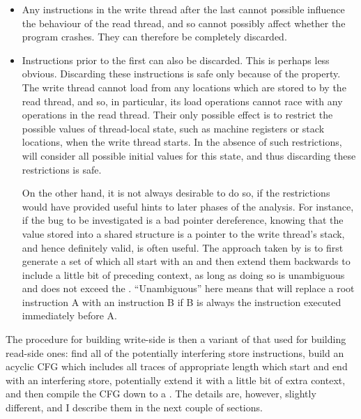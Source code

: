 \begin{itemize}
\item Any instructions in the write thread after the last
   cannot possible influence the behaviour
  of the read thread, and so cannot possibly affect whether the
  program crashes.  They can therefore be completely discarded.
\item Instructions prior to the first  can
  also be discarded.  This is perhaps less obvious.  Discarding these
  instructions is safe only because of the 
  property.  The write thread cannot load from any locations which are
  stored to by the read thread, and so, in particular, its load
  operations cannot race with any operations in the read thread.
  Their only possible effect is to restrict the possible values of
  thread-local state, such as machine registers or stack locations,
  when the write thread starts.  In the absence of such restrictions,
  {\technique} will consider all possible initial values for this
  state, and thus discarding these restrictions is safe.

  On the other hand, it is not always desirable to do so, if the
  restrictions would have provided useful hints to later phases of the
  analysis.  For instance, if the bug to be investigated is a bad
  pointer dereference, knowing that the value stored into a shared
  structure is a pointer to the write thread's stack, and hence
  definitely valid, is often useful.  The approach taken by
  {\implementation} is to first generate a set of  which
  all start with an  and then extend them
  backwards to include a little bit of preceding context, as long as
  doing so is unambiguous and does not exceed the .  ``Unambiguous'' here means that {\implementation} will
  replace a  root instruction A with an instruction B if
  B is always the instruction executed immediately before
  A.
\end{itemize}

The procedure for building write-side {\StateMachines} is then a
variant of that used for building read-side ones: find all of the
potentially interfering store instructions, build an acyclic CFG which
includes all traces of appropriate length which start and end with an
interfering store, potentially extend it with a little bit of extra
context, and then compile the CFG down to a {\StateMachine}.  The
details are, however, slightly different, and I describe them in the
next couple of sections.

